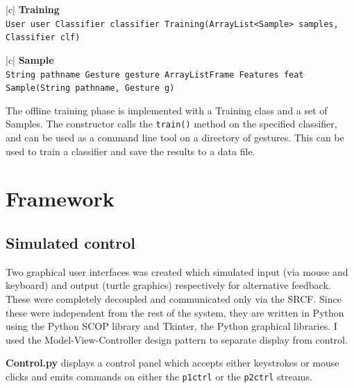 \documentclass[12pt,a4,notitlepage]{report}
\renewcommand{\_}{\texttt{\symbol{95}}}
\newcommand{\<}{\texttt{\symbol{60}}}
\renewcommand{\>}{\texttt{\symbol{62}}}
\newcommand{\class}[1]{\textbf{#1}}
\newcommand{\scopendpoint}[1]{\texttt{#1}}
\newcommand{\variable}[1]{\texttt{#1}}
\begin{document}
\begin{tabular}{|c|} \hline 
\class{Training} \\ \hline
{}
{\variable{User user \newline
Classifier classifier \newline
Training(ArrayList<Sample> samples, Classifier clf)
} } \\ \hline
\end{tabular}

\begin{tabular}{|c|} \hline 
\class{Sample} \\ \hline
{}
{\variable{String pathname \newline
Gesture gesture \newline
ArrayList\<Frame\> \newline
Features feat \newline
Sample(String pathname, Gesture g)
} } \\ \hline
\end{tabular}

The offline training phase is implemented with a Training class and a set of Samples. The constructor calls the \variable{train()} method on the specified classifier, and can be used as a command line tool on a directory of gestures. This can be used to train a classifier and save the results to a data file.

\section{Framework}

\subsection{Simulated control}

Two graphical user interfaces was created which simulated input (via mouse and keyboard) and output (turtle graphics) respectively for alternative feedback. These were completely decoupled and communicated only via the SRCF. Since these were independent from the rest of the system, they are written in Python using the Python SCOP library and Tkinter, the Python graphical libraries. I used the Model-View-Controller design pattern to separate display from control.

\class{Control.py} displays a control panel which accepts either keystrokes or mouse clicks and emits commands on either the \scopendpoint{p1ctrl} or the \scopendpoint{p2ctrl} streams.
\end{document}
